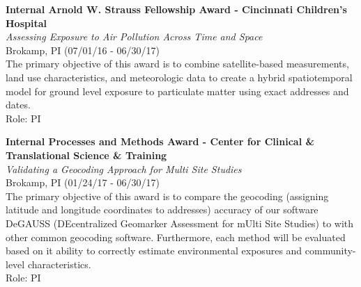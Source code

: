 \documentclass{nihbiosketch}
\begin{document}
\bigskip

\textbf{Internal Arnold W. Strauss Fellowship Award - Cincinnati
Children's Hospital}\\
\emph{Assessing Exposure to Air Pollution Across Time and Space}\\
Brokamp, PI (07/01/16 - 06/30/17)\\
The primary objective of this award is to combine satellite-based
measurements, land use characteristics, and meteorologic data to create
a hybrid spatiotemporal model for ground level exposure to particulate
matter using exact addresses and dates.\\
Role: PI

\bigskip

\textbf{Internal Processes and Methods Award - Center for Clinical \&
Translational Science \& Training}\\
\emph{Validating a Geocoding Approach for Multi Site Studies}\\
Brokamp, PI (01/24/17 - 06/30/17)\\
The primary objective of this award is to compare the geocoding
(assigning latitude and longitude coordinates to addresses) accuracy of
our software DeGAUSS (DEcentralized Geomarker Assessment for mUlti Site
Studies) to with other common geocoding software. Furthermore, each
method will be evaluated based on it ability to correctly estimate
environmental exposures and community-level characteristics.\\
Role: PI

\bigskip
\end{document}
